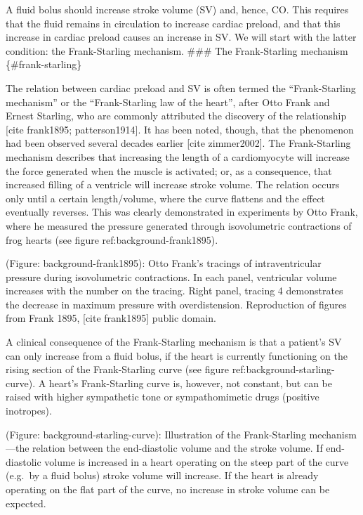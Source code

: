 \documentclass[a4paper, nobind]{templates/ociamthesis}
\begin{document}
A fluid bolus should increase stroke volume (SV) and, hence, CO. This requires that the fluid remains in circulation to increase cardiac preload, and that this increase in cardiac preload causes an increase in SV. We will start with the latter condition: the Frank-Starling mechanism.
\#\#\# The Frank-Starling mechanism \{\#frank-starling\}

The relation between cardiac preload and SV is often termed the ``Frank-Starling mechanism'' or the ``Frank-Starling law of the heart'', after Otto Frank and Ernest Starling, who are commonly attributed the discovery of the relationship {[}cite frank1895; patterson1914{]}. It has been noted, though, that the phenomenon had been observed several decades earlier {[}cite zimmer2002{]}. The Frank-Starling mechanism describes that increasing the length of a cardiomyocyte will increase the force generated when the muscle is activated; or, as a consequence, that increased filling of a ventricle will increase stroke volume. The relation occurs only until a certain length/volume, where the curve flattens and the effect eventually reverses. This was clearly demonstrated in experiments by Otto Frank, where he measured the pressure generated through isovolumetric contractions of frog hearts (see figure ref:background-frank1895).

(Figure: background-frank1895): Otto Frank's tracings of intraventricular pressure during isovolumetric contractions. In each panel, ventricular volume increases with the number on the tracing. Right panel, tracing 4 demonstrates the decrease in maximum pressure with overdistension. Reproduction of figures from Frank 1895, {[}cite frank1895{]} public domain.

A clinical consequence of the Frank-Starling mechanism is that a patient's SV can only increase from a fluid bolus, if the heart is currently functioning on the rising section of the Frank-Starling curve (see figure ref:background-starling-curve). A heart's Frank-Starling curve is, however, not constant, but can be raised with higher sympathetic tone or sympathomimetic drugs (positive inotropes).

(Figure: background-starling-curve): Illustration of the Frank-Starling mechanism---the relation between the end-diastolic volume and the stroke volume. If end-diastolic volume is increased in a heart operating on the steep part of the curve (e.g.~by a fluid bolus) stroke volume will increase. If the heart is already operating on the flat part of the curve, no increase in stroke volume can be expected.
\end{document}
